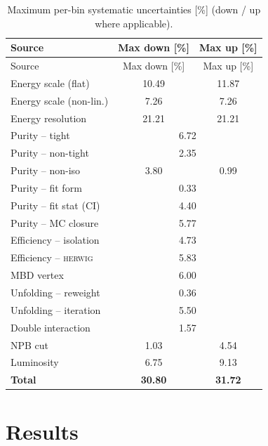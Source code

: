 \documentclass[11pt]{article}
\begin{document}
\begin{longtable}{lcc}
\caption{Maximum per-bin systematic uncertainties [\%] (down / up where
applicable).}\label{tab:syst}\\
\toprule
Source & Max down [\%] & Max up [\%] \\
\midrule
\endfirsthead
\toprule
Source & Max down [\%] & Max up [\%] \\
\midrule
\endhead
\bottomrule
\endfoot
Energy scale (flat)        & 10.49 & 11.87 \\
Energy scale (non-lin.)    & 7.26  & 7.26  \\
Energy resolution          & 21.21 & 21.21 \\
Purity -- tight            & \multicolumn{2}{c}{6.72} \\
Purity -- non-tight        & \multicolumn{2}{c}{2.35} \\
Purity -- non-iso          & 3.80  & 0.99  \\
Purity -- fit form         & \multicolumn{2}{c}{0.33} \\
Purity -- fit stat (CI)    & \multicolumn{2}{c}{4.40} \\
Purity -- MC closure       & \multicolumn{2}{c}{5.77} \\
Efficiency -- isolation    & \multicolumn{2}{c}{4.73} \\
Efficiency -- \textsc{herwig} & \multicolumn{2}{c}{5.83} \\
MBD vertex                 & \multicolumn{2}{c}{6.00} \\
Unfolding -- reweight      & \multicolumn{2}{c}{0.36} \\
Unfolding -- iteration     & \multicolumn{2}{c}{5.50} \\
Double interaction         & \multicolumn{2}{c}{1.57} \\
NPB cut                    & 1.03  & 4.54  \\
Luminosity                 & 6.75  & 9.13  \\
\midrule
\textbf{Total}             & \textbf{30.80} & \textbf{31.72} \\
\end{longtable}

\section{Results}
\label{sec:results}
\end{document}
